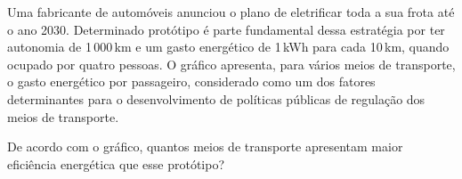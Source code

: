 Uma fabricante de automóveis anunciou o plano de eletrificar toda a sua frota até o ano 2030. Determinado protótipo é parte fundamental dessa estratégia por ter autonomia de 1\,000\,km e um gasto energético de 1\,kWh para cada 10\,km, quando ocupado por quatro pessoas. O gráfico apresenta, para vários meios de transporte, o gasto energético por passageiro, considerado como um dos fatores determinantes para o desenvolvimento de políticas públicas de regulação dos meios de transporte.\par
{}
De acordo com o gráfico, quantos meios de transporte apresentam maior eficiência energética que esse protótipo?\par
\begin{altlinha}
%
%
%
%
\end{altlinha}
